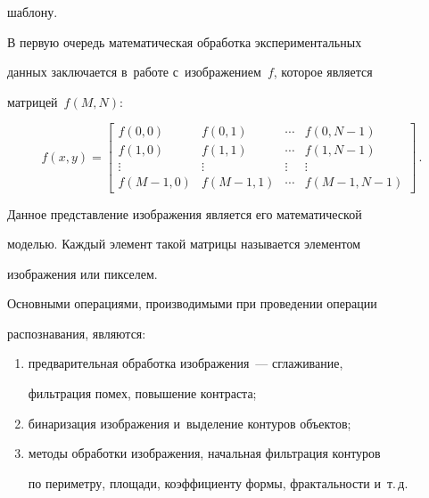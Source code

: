 шаблону.


   


   В первую очередь математическая обработка экспериментальных 


данных заключается в~работе с~изображением~$f$, которое является 


матрицей~$f(M,N)$:


    \begin{equation*}


    f(x,y)=\begin{bmatrix}


    f(0,0) & f(0,1) & \cdots & f(0,N-1)\\


    f(1,0)& f(1,1) &\cdots & f(1,N-1)\\


    \vdots& \vdots& \vdots& \vdots\\


    f(M-1,0) & f(M-1,1) & \cdots & f(M-1, N-1)


    \end{bmatrix}\,.


    \end{equation*}


   


   Данное представление изображения является его математической 


моделью. Каждый элемент такой матрицы называется элементом 


изображения или пикселем.


    


   Основными операциями, производимыми при проведении операции 


распознавания, являются:


    \begin{enumerate}[(1)]


   \item предварительная обработка изображения~--- сглаживание, 


фильтрация помех, повышение контраста;


   \item бинаризация изображения и~выделение контуров объектов;


   \item методы обработки изображения, начальная фильтрация контуров 


по периметру, площади, коэффициенту формы, фрактальности и~т.\,д.


   \end{enumerate}


